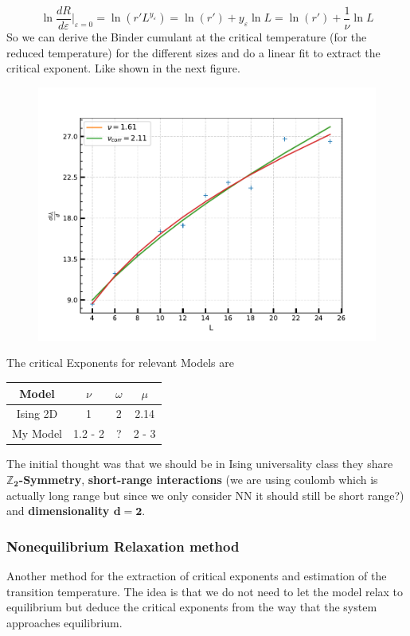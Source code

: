 	\begin{equation}
		\ln \frac{d R}{d \varepsilon} \Big |_{\varepsilon =	0} =	\ln \left(r' L^{y_\varepsilon} \right) =	\ln(r') + y_\varepsilon 	\ln L =	\ln(r') + \frac{1}{\nu}	\ln L
	\end{equation}
	So we can derive the Binder cumulant at the critical temperature (for the reduced temperature) for the different sizes and do a linear fit to extract the critical exponent. Like shown in the next figure.
	\begin{figure}
		\centering
		\includegraphics[width=12cm]{graphics/critical_exponent.pdf}
	\end{figure}
	
	The critical Exponents for relevant Models are
	\begin{center}
		\begin{tabular}{ c c c c}
			Model & $\nu$ & $\omega$ &  $\mu$ \\
			\hline
			Ising 2D & 1 & 2 & 2.14\\
			My Model & 1.2 - 2 & ? & 2 - 3
		\end{tabular}
	\end{center}
	The initial thought was that we should be in Ising universality class they share \textbf{$\boldsymbol{\mathbb{Z}_2}$-Symmetry}, \textbf{short-range interactions} (we are using coulomb which is actually long range but since we only consider NN it should still be short range?) and \textbf{dimensionality $\mathbf{d=2}$}.
	
	\subsubsection{Nonequilibrium Relaxation method}
	Another method for the extraction of critical exponents and estimation of the transition temperature. The idea is that we do not need to let the model relax to equilibrium but deduce the critical exponents from the way that the system approaches equilibrium.
	
